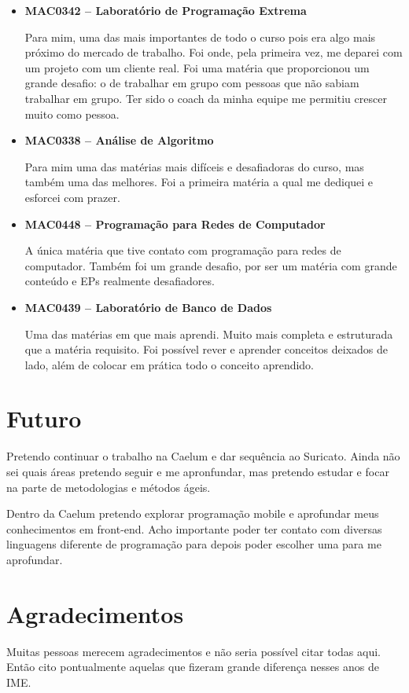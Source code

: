 \documentclass[titlepage,a4paper]{article}
\begin{document}
\begin{itemize}
	\item{\textbf{MAC0342 -- Laboratório de Programação Extrema}
	
    Para mim, uma das mais importantes de todo o curso pois era algo mais próximo do mercado de trabalho. Foi onde, pela primeira vez, me deparei com um projeto com um cliente real. Foi uma matéria que proporcionou um grande desafio: o de trabalhar em grupo com pessoas que não sabiam trabalhar em grupo. Ter sido o coach da minha equipe me permitiu crescer muito como pessoa.}
	\item{\textbf{MAC0338 -- Análise de Algoritmo}
	
	Para mim uma das matérias mais difíceis e desafiadoras do curso, mas também uma das melhores. Foi a primeira matéria a qual me dediquei e esforcei com prazer.}
	\item{\textbf{MAC0448 -- Programação para Redes de Computador}
	
	A única matéria que tive contato com programação para redes de computador. Também foi um grande desafio, por ser um matéria com grande conteúdo e EPs realmente desafiadores.}
	\item{\textbf{MAC0439 -- Laboratório de Banco de Dados}
	
    Uma das matérias em que mais aprendi. Muito mais completa e estruturada que a matéria requisito. Foi possível rever e aprender conceitos deixados de lado, além de colocar em prática todo o conceito aprendido.}
\end{itemize}

\section{Futuro}

Pretendo continuar o trabalho na Caelum e dar sequência ao Suricato. Ainda não sei quais áreas pretendo seguir e me apronfundar, mas pretendo estudar e focar na parte de metodologias e métodos ágeis.

Dentro da Caelum pretendo explorar programação mobile e aprofundar meus conhecimentos em front-end. Acho importante poder ter contato com diversas linguagens diferente de programação para depois poder escolher uma para me aprofundar.

\section{Agradecimentos}

Muitas pessoas merecem agradecimentos e não seria possível citar todas aqui. Então cito pontualmente aquelas que fizeram grande diferença nesses anos de IME.
\end{document}
